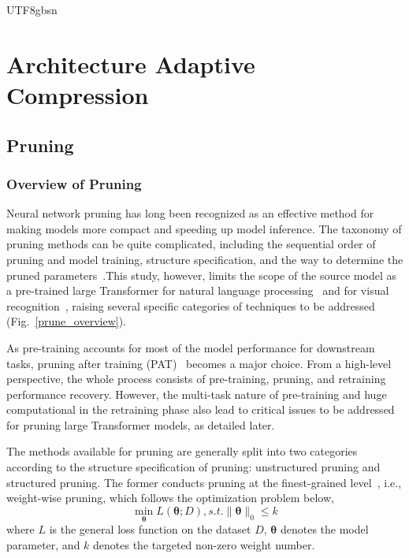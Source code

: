 \documentclass[10pt,journal,compsoc]{IEEEtran}
\newcommand{\<}{\left\langle}
\renewcommand{\>}{\right\rangle}
\newcommand{\1}{\mathbbm{1}}
\begin{document}
\begin{CJK}{UTF8}{gbsn}
\section{Architecture Adaptive Compression} 
\label{sec:apt}

\subsection{Pruning}

\subsubsection{Overview of Pruning}
Neural network pruning has long been recognized as an effective method for making models more compact and speeding up model inference. The taxonomy of pruning methods can be quite complicated, including the sequential order of pruning and model training, structure specification, and the way to determine the pruned parameters~\cite{Cheng2023ASO}.This study, however, limits the scope of the source model as a pre-trained large Transformer for natural language processing~\cite{Devlin2019BERTPO,brown2020language} and for visual recognition~\cite{Dosovitskiy2020AnII,Touvron2020TrainingDI,Liu2021SwinTH}, raising several specific categories of techniques to be addressed (Fig.~\ref{prune_overview}). 

As pre-training accounts for most of the model performance for downstream tasks, pruning after training (PAT)~\cite{Renda2020ComparingRA} becomes a major choice. From a high-level perspective, the whole process consists of pre-training, pruning, and retraining performance recovery. However, the multi-task nature of pre-training and huge computational in the retraining phase also lead to critical issues to be addressed for pruning large Transformer models, as detailed later.

The methods available for pruning are generally split into two categories according to the structure specification of pruning: unstructured pruning and structured pruning. The former conducts pruning at the finest-grained level~\cite{Lee2018SNIPSN,Zhang2018ASD}, i.e., weight-wise pruning, which follows the optimization problem below,
\begin{equation}
	\mathop{\min}_{\mathbf{\theta}} L(\mathbf{\theta}; D),
	s.t. \|\mathbf{\theta}\|_{0} \leq k
\end{equation}
\noindent where $L$ is the general loss function on the dataset $D$, $\mathbf{\theta}$ denotes the model parameter, and $k$ denotes the targeted non-zero weight number.


\end{CJK}
\end{document}
